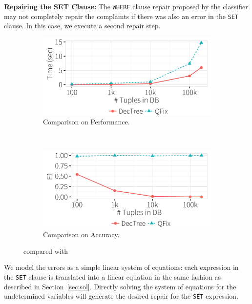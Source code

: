 \noindent
\textbf{Repairing the SET Clause:}
The \texttt{WHERE} clause repair proposed by the classifier may not completely repair 
the complaints if there was also an error in the \texttt{SET} clause. 
In this case, we execute a second repair step.
\begin{figure}[t]
\centering
  \begin{subfigure} [t]{.75\columnwidth}
  \includegraphics[width = .88\columnwidth]{figures/heuristictime}
  \caption{Comparison on Performance.}
  \label{f:heuristic_time} 
  \end{subfigure}\\

  \begin{subfigure} [t]{.75\columnwidth}
  \includegraphics[width = .88\columnwidth]{figures/heuristicacc}
  \caption{Comparison on Accuracy.}
  \label{f:heuristic_acc} 
  \end{subfigure}
  \vspace{-2mm}
 \caption{\dt compared with \sys}
 \label{f:heuristic}
 \vspace{-2mm}
\end{figure}

We model the errors as a simple linear system of equations: 
each expression in the \texttt{SET} clause is translated into a
linear equation in the same fashion as described in Section~\ref{sec:sol}.
Directly solving the system of equations for the undetermined variables 
will generate the desired repair for the \texttt{SET} expression.



